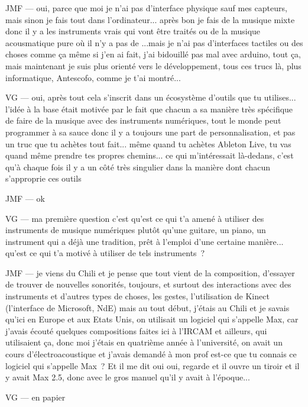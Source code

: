 JMF — oui, parce que moi je n'ai pas d'interface physique sauf mes capteurs, mais sinon je fais tout dans l'ordinateur... après bon je fais de la musique mixte donc il y a les instruments vrais qui vont être traités ou de la musique acousmatique pure où il n'y a pas de ...mais je n'ai pas d'interfaces tactiles ou des choses comme ça même si j'en ai fait, j'ai bidouillé pas mal avec arduino, tout ça, mais maintenant je suis plus orienté vers le développement, tous ces trucs là, plus informatique, Antescofo, comme je t'ai montré... 

VG — oui, après tout cela s'inscrit dans un écosystème d'outils que tu utilises... l'idée à la base était motivée par le fait que chacun a sa manière très spécifique de faire de la musique avec des instruments numériques, tout le monde peut programmer à sa sauce donc il y a toujours une part de personnalisation, et pas un truc que tu achètes tout fait... même quand tu achètes Ableton Live, tu vas quand même prendre tes propres chemins... ce qui m'intéressait là-dedans, c'est qu'à chaque fois il y a un côté très singulier dans la manière dont chacun s'approprie ces outils 
 
JMF — ok 

VG — ma première question c'est qu'est ce qui t'a amené à utiliser des instruments de musique numériques plutôt qu'une guitare, un piano, un instrument qui a déjà une tradition, prêt à l'emploi d'une certaine manière... qu'est ce qui t'a motivé à utiliser de tels instruments ? 

JMF — je viens du Chili et je pense que tout vient de la composition, d'essayer de trouver de nouvelles sonorités, toujours, et surtout des interactions avec des instruments et d'autres types de choses, les gestes, l'utilisation de Kinect (l'interface de Microsoft, NdE) mais au tout début, j'étais au Chili et je savais qu'ici en Europe et aux Etats Unis, on utilisait un logiciel qui s'appelle Max, car j'avais écouté quelques compositions faites ici à l'IRCAM et ailleurs, qui utilisaient ça, donc moi j'étais en quatrième année à l'université, on avait un cours d'électroacoustique et j'avais demandé à mon prof est-ce que tu connais ce logiciel qui s'appelle Max ? Et il me dit oui oui, regarde et il ouvre un tiroir et il y avait Max 2.5, donc avec le gros manuel qu'il y avait à l'époque...  

VG — en papier 

